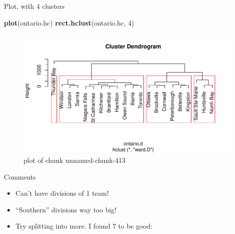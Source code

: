 \documentclass[ignorenonframetext,]{beamer}
\newenvironment{Shaded}{\begin{snugshade}}{\end{snugshade}}
\newcommand{\DecValTok}[1]{\textcolor[rgb]{0.00,0.00,0.81}{#1}}
\newcommand{\KeywordTok}[1]{\textcolor[rgb]{0.13,0.29,0.53}{\textbf{#1}}}
\newcommand{\NormalTok}[1]{#1}
\begin{document}
\begin{frame}[fragile]{Plot, with 4 clusters}
\protect\hypertarget{plot-with-4-clusters}{}

\begin{Shaded}
\begin{Highlighting}[]
\KeywordTok{plot}\NormalTok{(ontario.hc)}
\KeywordTok{rect.hclust}\NormalTok{(ontario.hc, }\DecValTok{4}\NormalTok{)}
\end{Highlighting}
\end{Shaded}

\begin{figure}
\centering
\includegraphics{figure/unnamed-chunk-413-1.pdf}
\caption{plot of chunk unnamed-chunk-413}
\end{figure}

\end{frame}

\begin{frame}{Comments}
\protect\hypertarget{comments-26}{}

\begin{itemize}
\item
  Can't have divisions of 1 team!
\item
  ``Southern'' divisions way too big!
\item
  Try splitting into more. I found 7 to be good:
\end{itemize}

\end{frame}
\end{document}
